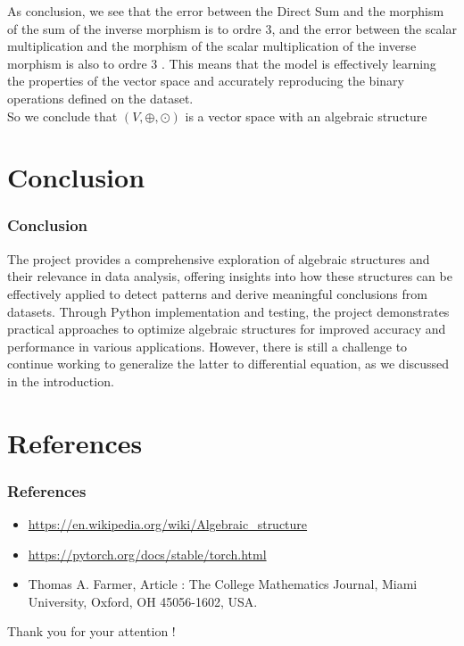 \documentclass{beamer}
\begin{document}
                \begin{frame}
                    As conclusion, we see that the error between the Direct Sum and the morphism of the sum of the inverse morphism is to ordre 3, and the error between the scalar multiplication and the morphism of the scalar multiplication of the inverse morphism is also to ordre 3 . This means that the model is effectively learning the properties of the vector space and accurately reproducing the binary operations defined on the dataset.\\
                    So we conclude that $(V,\oplus,\odot)$ is a vector space with an algebraic structure
                    
                \end{frame}

                \section{Conclusion}
                \begin{frame}
                    \frametitle{Conclusion}
                    The project provides a comprehensive 
                    exploration of algebraic structures and
                    their relevance in data analysis, 
    offering insights into how these 
    structures can be effectively applied 
    to detect patterns and derive meaningful
    conclusions from datasets. Through Python 
    implementation and testing, the project 
    demonstrates practical approaches to 
    optimize algebraic structures for 
    improved accuracy and performance 
    in various applications. However, there is still a 
    challenge to continue working to generalize the latter to 
    differential equation, as we discussed in the introduction.
    \end{frame}

    \section{References}
    \begin{frame}
        \frametitle{References}
        \begin{itemize}
            \item \url{https://en.wikipedia.org/wiki/Algebraic_structure}
            \item \url{https://pytorch.org/docs/stable/torch.html}
            \item Thomas A. Farmer, Article : The College Mathematics Journal, Miami University, Oxford, OH 45056-1602, USA. 
            
        \end{itemize}
    \end{frame}



    \begin{frame}
        \centering
        \Huge{Thank you for your attention !}
    \end{frame}
\end{document}
